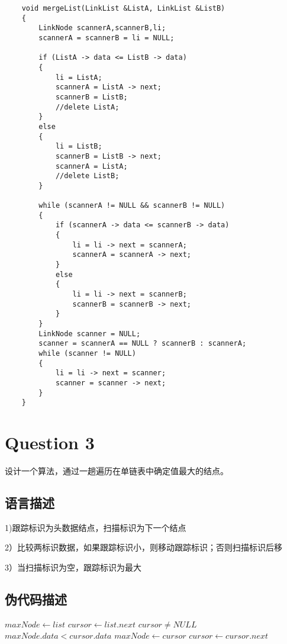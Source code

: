 \documentclass{article}
\begin{document}
\begin{verbatim}
    void mergeList(LinkList &ListA, LinkList &ListB)
    {
        LinkNode scannerA,scannerB,li;
        scannerA = scannerB = li = NULL;

        if (ListA -> data <= ListB -> data)
        {
            li = ListA;
            scannerA = ListA -> next;
            scannerB = ListB;
            //delete ListA;
        }
        else
        {
            li = ListB;
            scannerB = ListB -> next;
            scannerA = ListA;
            //delete ListB;
        }

        while (scannerA != NULL && scannerB != NULL)
        {
            if (scannerA -> data <= scannerB -> data)
            {
                li = li -> next = scannerA;
                scannerA = scannerA -> next;
            }
            else
            {
                li = li -> next = scannerB;
                scannerB = scannerB -> next;
            }
        }
        LinkNode scanner = NULL;
        scanner = scannerA == NULL ? scannerB : scannerA;
        while (scanner != NULL)
        {
            li = li -> next = scanner;
            scanner = scanner -> next;
        }
    }

\end{verbatim}

\section{Question 3} 

设计一个算法，通过一趟遍历在单链表中确定值最大的结点。


\subsection{语言描述} 

1)跟踪标识为头数据结点，扫描标识为下一个结点\par
2）比较两标识数据，如果跟踪标识小，则移动跟踪标识；否则扫描标识后移\par
3）当扫描标识为空，跟踪标识为最大

\subsection{伪代码描述}
\begin{codebox}

\li $maxNode \gets list$
\li $ cursor \gets list.next$
\li \While $ cursor \neq NULL $
\li 	\Do
\li 	\If $ maxNode.data < cursor.data $
\li 		\Then 
\li 			$ maxNode \gets cursor $
		\End
\li $ cursor \gets cursor.next $  

\end{codebox}
\end{document}
